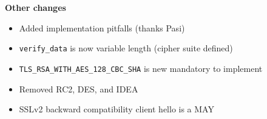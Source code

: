 \documentclass[helvetica]{seminar}
\newcommand{\heading}[1]{%
  \begin{center} 
    \large\bf 
    #1 
  \end{center} 
  \vspace{.4 in}}
\begin{document}
\begin{slide}
\heading{Other changes}

\begin{itemize}
\item Added implementation pitfalls (thanks Pasi)
\item \verb^verify_data^ is now variable length (cipher suite defined)
\item \verb^TLS_RSA_WITH_AES_128_CBC_SHA^ is new mandatory to implement
\item Removed RC2, DES, and IDEA
\item SSLv2 backward compatibility client hello is a MAY
\end{itemize}

\end{slide}
\end{document}
